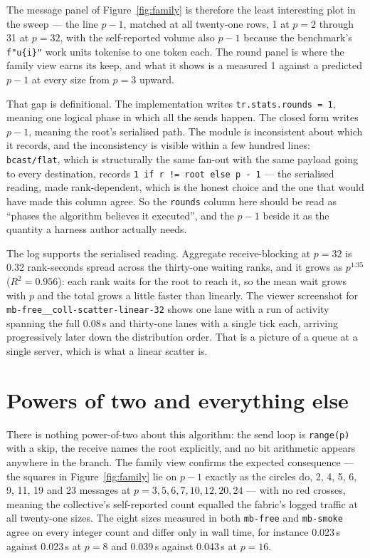 \documentclass[11pt]{article}
\begin{document}
The message panel of Figure~\ref{fig:family} is therefore the least interesting plot in the sweep
--- the line $p-1$, matched at all twenty-one rows, 1 at $p=2$ through 31 at $p=32$, with the
self-reported volume also $p-1$ because the benchmark's \verb|f"u{i}"| work units tokenise to one
token each. The round panel is where the family view earns its keep, and what it shows is a
measured 1 against a predicted $p-1$ at every size from $p=3$ upward.

That gap is definitional. The implementation writes \texttt{tr.stats.rounds = 1}, meaning one
logical phase in which all the sends happen. The closed form writes $p-1$, meaning the root's
serialised path. The module is inconsistent about which it records, and the inconsistency is
visible within a few hundred lines: \texttt{bcast/flat}, which is structurally the same fan-out
with the same payload going to every destination, records
\texttt{1 if r != root else p - 1} --- the serialised reading, made rank-dependent, which is the
honest choice and the one that would have made this column agree. So the \texttt{rounds} column
here should be read as ``phases the algorithm believes it executed'', and the $p-1$ beside it as
the quantity a harness author actually needs.

The log supports the serialised reading. Aggregate receive-blocking at $p=32$ is 0.32
rank-seconds spread across the thirty-one waiting ranks, and it grows as $p^{1.35}$
($R^2 = 0.956$): each rank waits for the root to reach it, so the mean wait grows with $p$ and the
total grows a little faster than linearly. The viewer screenshot for
\texttt{mb-free\_\_coll-scatter-linear-32} shows one lane with a run of activity spanning the full
0.08\,s and thirty-one lanes with a single tick each, arriving progressively later down the
distribution order. That is a picture of a queue at a single server, which is what a linear
scatter is.

\section{Powers of two and everything else}

There is nothing power-of-two about this algorithm: the send loop is \texttt{range(p)} with a
skip, the receive names the root explicitly, and no bit arithmetic appears anywhere in the branch.
The family view confirms the expected consequence --- the squares in Figure~\ref{fig:family} lie
on $p-1$ exactly as the circles do, 2, 4, 5, 6, 9, 11, 19 and 23 messages at
$p = 3, 5, 6, 7, 10, 12, 20, 24$ --- with no red crosses, meaning the collective's self-reported
count equalled the fabric's logged traffic at all twenty-one sizes. The eight sizes measured in
both \texttt{mb-free} and \texttt{mb-smoke} agree on every integer count and differ only in wall
time, for instance 0.023\,s against 0.023\,s at $p=8$ and 0.039\,s against 0.043\,s at $p=16$.
\end{document}
